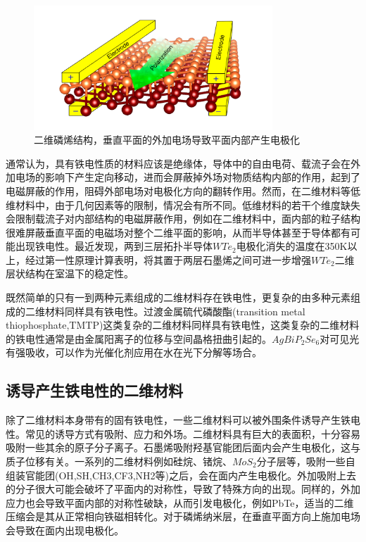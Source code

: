 \begin{figure}[h]
    \centering
\includegraphics[width=0.8\textwidth]{./pic/013.png}
\caption{二维磷烯结构，垂直平面的外加电场导致平面内部产生电极化}

\label{dog013}
\end{figure}

通常认为，具有铁电性质的材料应该是绝缘体，导体中的自由电荷、载流子会在外加电场的影响下产生定向移动，进而会屏蔽掉外场对物质结构内部的作用，起到了电磁屏蔽的作用，阻碍外部电场对电极化方向的翻转作用。然而，在二维材料等低维材料中，由于几何因素等的限制，情况会有所不同。低维材料的若干个维度缺失会限制载流子对内部结构的电磁屏蔽作用，例如在二维材料中，面内部的粒子结构很难屏蔽垂直平面的电磁场对整个二维平面的影响，从而半导体甚至于导体都有可能出现铁电性。最近发现，两到三层拓扑半导体$WTe_{2}$电极化消失的温度在350K以上，经过第一性原理计算表明，将其置于两层石墨烯之间可进一步增强$WTe_{2}$二维层状结构在室温下的稳定性。

既然简单的只有一到两种元素组成的二维材料存在铁电性，更复杂的由多种元素组成的二维材料同样具有铁电性。过渡金属硫代磷酸酯(transition metal thiophosphate,TMTP)这类复杂的二维材料同样具有铁电性，这类复杂的二维材料的铁电性通常是由金属阳离子的位移与空间晶格扭曲引起的。$ AgBiP_{2}Se_{6}$对可见光有强吸收，可以作为光催化剂应用在水在光下分解等场合。

\subsection{诱导产生铁电性的二维材料}

除了二维材料本身带有的固有铁电性，一些二维材料可以被外围条件诱导产生铁电性。常见的诱导方式有吸附、应力和外场。二维材料具有巨大的表面积，十分容易吸附一些其余的原子分子离子。石墨烯吸附羟基官能团后面内会产生电极化，这与质子位移有关。一系列的二维材料例如硅烷、锗烷、$MoS_{2}$分子层等，吸附一些自组装官能团(OH,SH,CH3,CF3,NH2等)之后，会在面内产生电极化。外加吸附上去的分子很大可能会破坏了平面内的对称性，导致了特殊方向的出现。同样的，外加应力也会导致平面内部的对称性破缺，从而引发电极化，例如PbTe，适当的二维压缩会是其从正常相向铁磁相转化。对于磷烯纳米层，在垂直平面方向上施加电场会导致在面内出现电极化。

